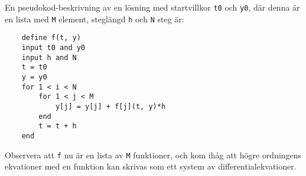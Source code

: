En pseudokod-beskrivning av en lösning med startvillkor \verb|t0| och \verb|y0|, där denna är en lista med \verb|M| element, steglängd \verb|h| och \verb|N| steg är:
\begin{lstlisting}
	define f(t, y)
	input t0 and y0
	input h and N
	t = t0
	y = y0
	for 1 < i < N
		for 1 < j < M
			y[j] = y[j] + f[j](t, y)*h
		end
		t = t + h
	end
\end{lstlisting}

Observera att \verb|f| nu är en lista av \verb|M| funktioner, och kom ihåg att högre ordningens ekvationer med en funktion kan skrivas som ett system av differentialekvationer.
